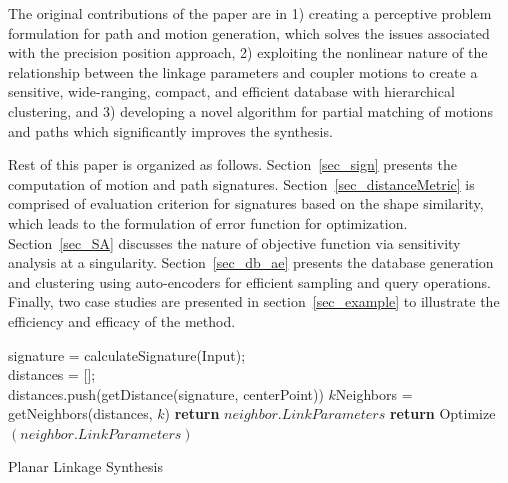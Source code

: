 \documentclass[twocolumn,10pt]{asme2ej}
\begin{document}
The original contributions of the paper are in 1) creating a perceptive problem formulation for path and motion generation, which solves the issues associated with the precision position approach,
2) exploiting the nonlinear nature of the relationship between the linkage parameters and coupler motions to create a sensitive, wide-ranging, compact, and efficient database with hierarchical clustering, and 3) developing a novel algorithm for partial matching of motions and paths which significantly improves the synthesis. 


Rest of this paper is organized as follows. Section~\ref{sec_sign} presents the computation of motion and path signatures.
Section~\ref{sec_distanceMetric} is comprised of evaluation criterion for signatures based on the shape similarity, which leads to the formulation of error function for optimization.
Section~\ref{sec_SA} discusses the nature of objective function via sensitivity analysis at a singularity.
Section~\ref{sec_db_ae} presents the database generation and clustering using auto-encoders for efficient sampling and query operations.
Finally, two case studies are presented in section~\ref{sec_example} to illustrate the efficiency and efficacy of the method.

\begin{algorithm}
    signature = calculateSignature(Input); \\
    distances = [];\\
    {
      distances.push(getDistance(signature, centerPoint))
    }
    $k$Neighbors = getNeighbors(distances, $k$)
    {
      {
        \textbf{return} $neighbor.LinkParameters$
      }
      {
        \textbf{return} Optimize$(neighbor.LinkParameters)$
      }
    }
    \caption{Planar Linkage Synthesis}
    \label{alg_overall}
\end{algorithm}
\end{document}

